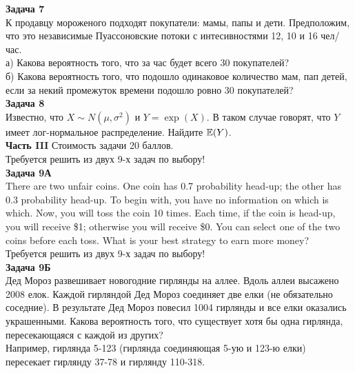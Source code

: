 \documentclass[12pt, a4paper]{article}\usepackage[]{graphicx}\usepackage[]{color}
\begin{document}


\textbf{Задача 7} \\
К продавцу мороженого подходят покупатели: мамы, папы и дети. Предположим, что это независимые Пуассоновские потоки с интесивностями 12, 10 и 16 чел/час. \\
а) Какова вероятность того, что за час будет всего 30 покупателей? \\
б) Какова вероятность того, что подошло одинаковое количество мам, пап детей, если за некий промежуток времени подошло ровно 30 покупателей? \\


\textbf{Задача 8} \\ %
Известно, что $X\sim N(\mu,\sigma^{2})$ и $Y=\exp(X)$. В таком случае говорят, что $Y$ имеет лог-нормальное распределение. Найдите $\mathbb{E}(Y)$. \\



\textbf{Часть III} Стоимость задачи 20 баллов. \\

Требуется решить \textbf{} из двух 9-х задач по
выбору! \\


\textbf{Задача 9А} \\
There are two unfair coins. One coin has 0.7 probability head-up; the other has 0.3 probability head-up. To begin with, you have no information on which is which. Now, you will toss the coin 10 times. Each time, if the coin is head-up, you will receive \$1; otherwise you will receive \$0. You can select one of the two coins before each toss. What is your best strategy to earn more money? \\



Требуется решить \textbf{} из двух 9-х задач по
выбору! \\



\textbf{Задача 9Б} \\
Дед Мороз развешивает новогодние гирлянды на аллее. Вдоль аллеи высажено 2008 елок. Каждой гирляндой Дед Мороз соединяет две елки (не обязательно соседние). В результате Дед Мороз повесил 1004 гирлянды и все елки оказались украшенными. Какова вероятность того, что существует хотя бы одна гирлянда, пересекающаяся с каждой из других? \\
Например, гирлянда 5-123 (гирлянда соединяющая 5-ую и 123-ю елки) пересекает гирлянду 37-78 и гирлянду 110-318.
\end{document}
